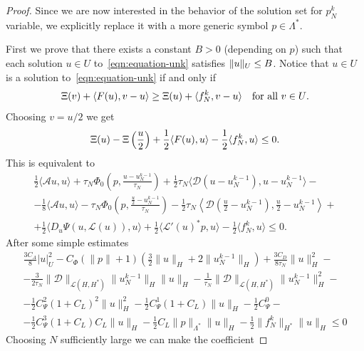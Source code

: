 \documentclass[a4paper,10pt,oneside]{amsbook}
\numberwithin{section}{chapter}
\numberwithin{equation}{chapter}
\theoremstyle{definition}
\DeclarePairedDelimiter{\norm}{\lVert}{\rVert}
\DeclarePairedDelimiter{\dual}{\langle}{\rangle}
\begin{document}
\begin{proof}
Since we are now interested in the behavior of the solution set for $p_N^k$ variable, we explicitly replace it with a more generic symbol $p\in\Lambda^*$.

First we prove that there exists a constant $B>0$ (depending on $p$) such that each solution $u\in U$ to~\eqref{eqn:equation-unk} satisfies $\norm{u}_U\le B$. Notice that $u\in U$ is a solution to~\eqref{eqn:equation-unk} if and only if
\begin{equation}
\label{eqn:equation-unk-explicit}
\Xi(v)+\dual{F(u),v-u}\ge\Xi(u)+\dual{f_N^k,v-u}\quad\text{for all $v\in U$}.
\end{equation}
Choosing $v=u/2$ we get
\[
\Xi(u)-\Xi\left(\frac{u}{2}\right)+\frac{1}{2}\dual{F(u),u}-\frac{1}{2}\dual{f_N^k,u}\le0.
\]
This is equivalent to
\begin{equation}
\begin{multlined}
\frac{1}{2}\langle \mathcal{A}u,u\rangle+\tau_N\Phi_0\left(p,\frac{u-u_N^{k-1}}{\tau_N}\right)+\frac{1}{2}\tau_N\langle\mathcal{D}(u-u_N^{k-1}),u-u_N^{k-1}\rangle-\\
-\frac{1}{8}\langle \mathcal{A}u,u\rangle-\tau_N\Phi_0\left(p,\frac{\frac{u}{2}-u_N^{k-1}}{\tau_N}\right)-\frac{1}{2}\tau_N\left\langle \mathcal{D}\left(\frac{u}{2}-u_N^{k-1}\right),\frac{u}{2}-u_N^{k-1}\right\rangle+\\
+\frac{1}{2}\langle D_u\Psi(u,\mathcal{L}(u)),u\rangle+\frac{1}{2}\langle\mathcal{L}'(u)^*p,u\rangle-\frac{1}{2}\langle f_N^k,u\rangle\le0.
\end{multlined} 
\end{equation}
After some simple estimates
\begin{equation}
\label{eqn:boundedness}
\begin{multlined}
\frac{3C_A}{8}|u|_U^2-C_{\Phi}(\|p\|+1)\left(\frac{3}{2}\|u\|_H+2\|u_N^{k-1}\|_H\right)+\frac{3C_D}{8\tau_N}\|u\|_H^2-\\
-\frac{3}{2\tau_N}\|\mathcal{D}\|_{\mathscr{L}(H,H^*)}\|u_N^{k-1}\|_H\|u\|_H-\frac{1}{\tau_N}\|\mathcal{D}\|_{\mathscr{L}(H,H^*)}\|u_N^{k-1}\|_H^2-\\
-\frac{1}{2}C_{\Psi}^2(1+C_L)^2\|u\|_H^2-\frac{1}{2}C_{\Psi}^1(1+C_L)\|u\|_H-\frac{1}{2}C_{\Psi}^0-\\
-\frac{1}{2}C_{\Psi}^3(1+C_L)C_L\|u\|_H-\frac{1}{2}C_L\|p\|_{\Lambda^*}\|u\|_H-\frac{1}{2}\|f_N^k\|_{H^*}\|u\|_H\le0
\end{multlined}
\end{equation}
Choosing $N$ sufficiently large we can make the coefficient

\end{proof}
\end{document}
